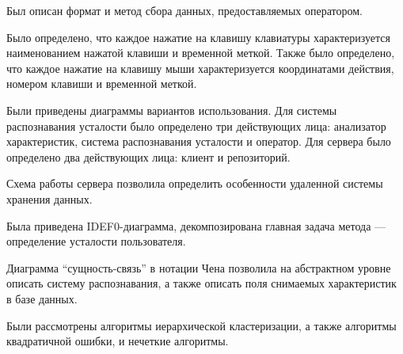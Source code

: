 Был описан формат и метод сбора данных, предоставляемых оператором.

Было определено, что каждое нажатие на клавишу клавиатуры характеризуется наименованием нажатой клавиши и временной меткой. Также было определено, что каждое нажатие на клавишу мыши характеризуется координатами действия, номером клавиши и временной меткой.

Были приведены диаграммы вариантов использования. Для системы распознавания усталости было определено три действующих лица: анализатор характеристик, система распознавания усталости и оператор. Для сервера было определено два действующих лица: клиент и репозиторий.

Схема работы сервера позволила определить особенности удаленной системы хранения данных.

Была приведена IDEF0-диаграмма, декомпозирована главная задача метода --- определение усталости пользователя.

Диаграмма ``сущность-связь'' в нотации Чена позволила на абстрактном уровне описать систему распознавания, а также описать поля снимаемых характеристик в базе данных.

Были рассмотрены алгоритмы иерархической кластеризации, а также алгоритмы квадратичной ошибки, и нечеткие алгоритмы.

\pagebreak